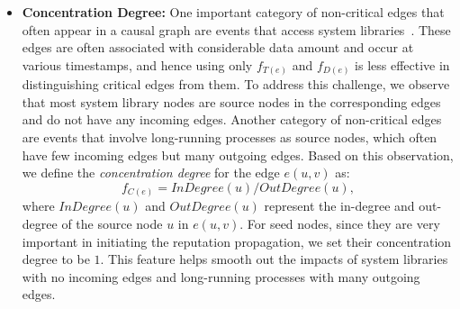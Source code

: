 \begin{itemize}[noitemsep, topsep=1pt, partopsep=1pt, listparindent=\parindent, leftmargin=*]



\item \textbf{Concentration Degree:}
One important category of non-critical edges that often appear in a causal graph are events that access system libraries~\cite{reduction,reduction2}. These edges are often associated with considerable data amount and occur at various timestamps, and hence using only $f_{T(e)}$ and $f_{D(e)}$ is less effective in distinguishing critical edges from them.
To address this challenge, we observe that most system library nodes are source nodes in the corresponding edges and do not have any incoming edges.
Another category of non-critical edges are events that involve long-running processes as source nodes, which often have few incoming edges but many outgoing edges.
Based on this observation, we define the \emph{concentration degree} for the edge $e(u, v)$ as:
\begin{equation}
    \label{eq:structure-feature}
    f_{C(e)} = InDegree(u)/OutDegree(u),
\end{equation}
where $InDegree(u)$ and $OutDegree(u)$ represent the in-degree and out-degree of the source node $u$ in $e(u,v)$.
For seed nodes, since they are very important in initiating the reputation propagation, we set their concentration degree to be $1$.
This feature helps smooth out the impacts of system libraries with no incoming edges and long-running processes with many outgoing edges.


\end{itemize}




